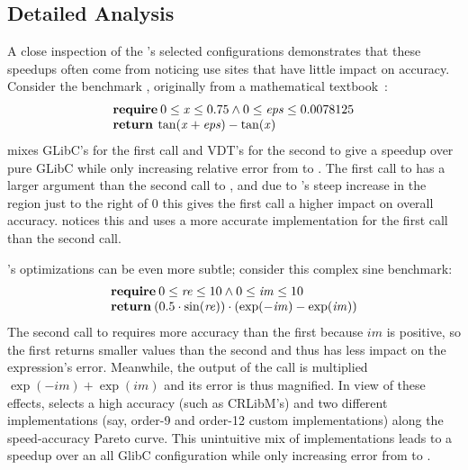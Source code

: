 \documentclass[paper.tex]{subfiles}
\begin{document}
\subsection{Detailed Analysis}


A close inspection of the \name's selected configurations
  demonstrates that these speedups often come from noticing
  use sites that have little impact on accuracy.
Consider the benchmark ,
  originally from a mathematical textbook~\cite{nmse}:
\[
\begin{array}{l}
\text{\textbf{require}}\: 0 \le \mathit{x} \le 0.75 \land 0 \le \mathit{eps} \le 0.0078125\\
\text{\textbf{return}}\: \tan(\mathit{x} + \mathit{eps}) - \tan(\mathit{x})
\end{array}
\]
\name mixes GLibC's  for the first call and VDT's  for the second
  to give a \nDetailedOneSpeedup speedup over pure GLibC while only increasing
  relative error from \nDetailedOneErrorGlibc to \nDetailedOneErrorChosen.
The first call to  has a larger argument than the second
  call to , and due to 's steep increase in the region just to the
  right of $0$ this gives the first call a higher impact on overall accuracy.
\name notices this and uses a more accurate implementation for
  the first call than the second call.


\name's optimizations can be even more subtle;
  consider this complex sine benchmark:
\[
\begin{array}{l}
\text{\textbf{require}}\:0 \le \mathit{re} \le 10 \land 0 \le \mathit{im} \le 10\\
\text{\textbf{return}}\: (0.5 \cdot \sin(\mathit{re})) \cdot (\exp(-\mathit{im}) - \exp(\mathit{im}))
\end{array}
\]
The second call to  requires more accuracy than the first
  because $\mathit{im}$ is positive,
  so the first  returns smaller values than the second
  and thus has less impact on the expression's error.
Meanwhile, the output of the  call
  is multiplied $\exp(-\mathit{im}) + \exp(\mathit{im})$
  and its error is thus magnified.
In view of these effects,
  \name selects a high accuracy  (such as CRLibM's)
  and two different  implementations
  (say, order-9 and order-12 custom implementations)
  along the speed-accuracy Pareto curve.
This unintuitive mix of implementations leads to a \nDetailedTwoSpeedup speedup
  over an all GlibC configuration while only increasing error from
  \nDetailedTwoErrorGlibc to \nDetailedTwoErrorChosen.
\end{document}
